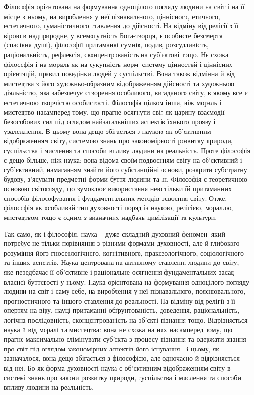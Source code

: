 Філософія орієнтована на формування одноцілого погляду людини на світ і
на її місце в ньому, на вироблення у неї пізнавального, ціннісного, етичного,
естетичного, гуманістичного ставлення до дійсності. На відміну від релігії з її
вірою в надприродне, у всемогутність Бога-творця, в особисте безсмертя
(спасіння душі), філософії притаманні сумнів, подив, розсудливість,
раціональність, рефлексія, сконцентрованість на суб’єктові тощо. Не схожа
філософія і на мораль як на сукупність норм, систему цінностей і ціннісних
орієнтацій, правил поведінки людей у суспільстві. Вона також відмінна й від
мистецтва з його художньо-образним відображенням дійсності та художньою
діяльністю, яка забезпечує створення особливого, вигаданого світу, в якому все
є естетичною творчістю особистості. Філософія цілком інша, ніж мораль і
мистецтво насамперед тому, що прагне осягнути світ як царину взаємодії
безособових сил під оглядом найзагальніших аспектів їхнього прояву і
узалежнення. В цьому вона дещо збігається з наукою як об’єктивним
відображенням світу, системою знань про закономірності розвитку природи,
суспільства і мислення та способи впливу людини на реальність. Проте
філософія є дещо більше, ніж наука: вона відома своїм подвоєнням світу на
об’єктивний і суб’єктивний, намаганням знайти його субстанційні основи,
розкрити субстратну будову, з’ясувати предметні форми буття людини та ін.
Філософія є теоретичною основою світогляду, що зумовлює використання нею
тільки їй притаманних способів філософування і фундаментальних методів
освоєння світу. Отже, філософія як особливий тип духовності поряд із наукою,
релігією, мораллю, мистецтвом тощо є одним з визначних надбань цивілізації
та культури.

Так само, як і філософія, наука -- дуже складний духовний феномен, який
потребує не тільки порівняння з різними формами духовності, але й глибокого
розуміння його гносеологічного, когнітивного, праксеологічного,
соціологічного та інших аспектів. Наука центрована на активному ставленні
людини до світу, яке передбачає її об’єктивне і раціональне осягнення
фундаментальних засад власної буттєвості у ньому. Наука орієнтована на
формування одноцілого погляду людини на світ і саму себе, на вироблення у
неї пізнавального, пояснювального, прогностичного та іншого ставлення до
реальності. На відміну від релігії з її опертям на віру, науці притаманні
обґрунтованість, доведення, раціональність, логічна послідовність,
сконцентрованість на об’єкті пізнання тощо. Відрізняється наука й від моралі та
мистецтва: вона не схожа на них насамперед тому, що прагне максимально
елімінувати суб’єкта з процесу пізнання та одержати знання про світ під
оглядом закономірних аспектів його існування. В цьому, як зазначалося, вона
дещо збігається з філософією, але одночасно й відрізняється від неї. Бо як
форма духовності наука є об’єктивним відображенням світу в системі знань про
закони розвитку природи, суспільства і мислення та способи впливу людини на
реальність.

